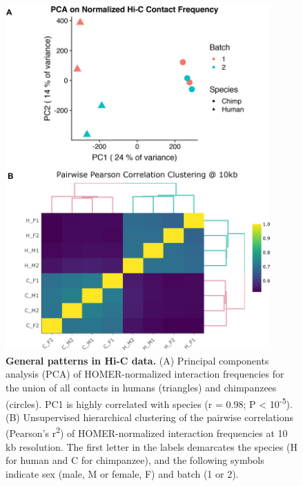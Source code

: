 \begin{figure}
\centering
\includegraphics[width=4in]{img/fig1.PNG}
\caption[General patterns in Hi-C data.]{\textbf{General patterns in Hi-C data.} (A) Principal components analysis (PCA) of HOMER-normalized interaction frequencies for the union of all contacts in humans (triangles) and chimpanzees (circles). PC1 is highly correlated with species (r = 0.98; P {\textless} 10\textsuperscript{-5}). (B) Unsupervised hierarchical clustering of the pairwise correlations (Pearson's r\textsuperscript{2}) of HOMER-normalized interaction frequencies at 10 kb resolution. The first letter in the labels demarcates the species (H for human and C for chimpanzee), and the following symbols indicate sex (male, M or female, F) and batch (1 or 2).}
\label{fig:fig1}
\end{figure}

